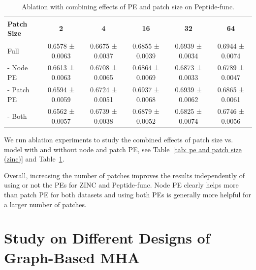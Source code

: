 \documentclass{article}
\begin{document}
\begin{table}[!ht]
    \centering
    \small
    \caption{Ablation with combining effects of PE and patch size on Peptide-func.}
    \label{tab: pe and patch size (peptide)}
    \begin{tabular}{lccccc}
    \toprule
    Patch Size & 2 & 4 & 16 & 32 & 64 
    \\
    \midrule
    Full     
    & 0.6578 ± 0.0063 
    & 0.6675 ± 0.0037 
    & 0.6855 ± 0.0039
    & 0.6939 ± 0.0034 
    & 0.6944 ± 0.0074
    \\
    
     - Node PE 
     & 0.6613 ± 0.0063
     & 0.6708 ± 0.0065
     & 0.6864 ± 0.0069
     & 0.6873 ± 0.0033 
     & 0.6789 ± 0.0047
     \\
     
     - Patch PE
     & 0.6594 ± 0.0059
     & 0.6724 ± 0.0051
     & 0.6937 ± 0.0068
     & 0.6939 ± 0.0062
     & 0.6865 ± 0.0061
     \\
     
     - Both 
     & 0.6562 ± 0.0057
     & 0.6739 ± 0.0038
     & 0.6879 ± 0.0052
     & 0.6825 ± 0.0074
     & 0.6746 ± 0.0056
     \\
     \bottomrule
    \end{tabular}
\end{table}

We run ablation experiments to study the combined effects of patch size vs. model with and without node and patch PE, see Table~\ref{tab: pe and patch size (zinc)} and Table~\ref{tab: pe and patch size (peptide)}.


Overall, increasing the number of patches improves the results independently of using or not the PEs for ZINC and Peptide-func. Node PE clearly helps more than patch PE for both datasets and using both PEs is generally more helpful for a larger number of patches.


\section{Study on Different Designs of Graph-Based MHA}\label{section: design of MHA}
\end{document}

